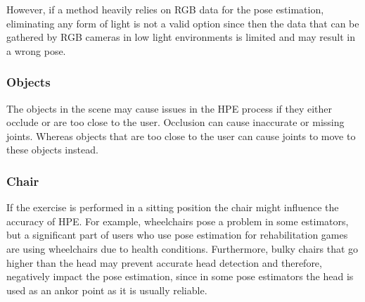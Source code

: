 However, if a method heavily relies on RGB data for the pose estimation, eliminating any form of light is not a valid option since then the data that can be gathered by RGB cameras in low light environments is limited and may result in a wrong pose.

\subsubsection{Objects}

The objects in the scene may cause issues in the HPE process if they either occlude or are too close to the user. Occlusion can cause inaccurate or missing joints. Whereas objects that are too close to the user can cause joints to move to these objects instead.

\subsubsection{Chair}

If the exercise is performed in a sitting position the chair might influence the accuracy of HPE. For example, wheelchairs pose a problem in some estimators, but a significant part of users who use pose estimation for rehabilitation games are using wheelchairs due to health conditions. Furthermore, bulky chairs that go higher than the head may prevent accurate head detection and therefore, negatively impact the pose estimation, since in some pose estimators the head is used as an ankor point as it is usually reliable.
